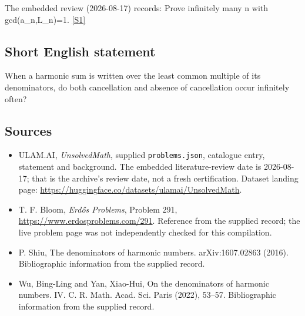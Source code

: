 \documentclass[11pt,a4paper]{article}
\newcommand{\sref}[2]{\hyperlink{source:#1:#2}{[S#2]}}
\begin{document}
The embedded review (2026-08-17) records: Prove infinitely many n with gcd(a\_n,L\_n)=1. \sref{statement}{1}

\subsection{Short English statement}

When a harmonic sum is written over the least common multiple of its denominators, do both cancellation and absence of cancellation occur infinitely often?

\subsection{Sources}

{\small

\begin{itemize}

\item[\hypertarget{source:statement:1}{S1}] ULAM.AI, \emph{UnsolvedMath}, supplied \texttt{problems.json}, catalogue entry, statement and background. The embedded literature-review date is 2026-08-17; that is the archive’s review date, not a fresh certification. Dataset landing page: \url{https://huggingface.co/datasets/ulamai/UnsolvedMath}.

\item[\hypertarget{source:statement:2}{S2}] T. F. Bloom, \emph{Erdős Problems}, Problem 291, \url{https://www.erdosproblems.com/291}. Reference from the supplied record; the live problem page was not independently checked for this compilation.

\item[\hypertarget{source:statement:3}{S3}] P. Shiu, The denominators of harmonic numbers. arXiv:1607.02863 (2016). Bibliographic information from the supplied record.

\item[\hypertarget{source:statement:4}{S4}] Wu, Bing-Ling and Yan, Xiao-Hui, On the denominators of harmonic numbers. {IV}. C. R. Math. Acad. Sci. Paris (2022), 53--57. Bibliographic information from the supplied record.

\end{itemize}

}

\label{end:statement}
\end{document}
